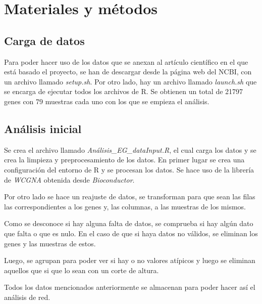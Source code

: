 \section{Materiales y métodos}
\subsection{Carga de datos}
Para poder hacer uso de los datos que se anexan al artículo científico en el que está basado el proyecto, se han de descargar desde la página web del NCBI, con un archivo llamado \textit{setup.sh}. Por otro lado, hay un archivo llamado \textit{launch.sh} que se encarga de ejecutar todos los archivos de R. Se obtienen un total de 21797 genes con 79 muestras cada uno con los que se empieza el análisis.

\subsection{Análisis inicial}
Se crea el archivo llamado \textit{Análisis\_EG\_dataInput.R}, el cual carga los datos y se crea la limpieza y preprocesamiento de los datos. En primer lugar se crea una configuración del entorno de R y se procesan los datos. Se hace uso de la librería de \textit{WCGNA} obtenida desde \textit{Bioconductor}. 

Por otro lado se hace un reajuste de datos, se transforman para que sean las filas las correspondientes a los genes y, las columnas, a las muestras de los mismos.

Como se desconoce si hay alguna falta de datos, se comprueba si hay algún dato que falta o que es nulo. En el caso de que si haya datos no válidos, se eliminan los genes y las muestras de estos.

Luego, se agrupan para poder ver si hay o no valores atípicos y luego se eliminan aquellos que si que lo sean con un corte de altura. 

Todos los datos mencionados anteriormente se almacenan para poder hacer así el análisis de red.